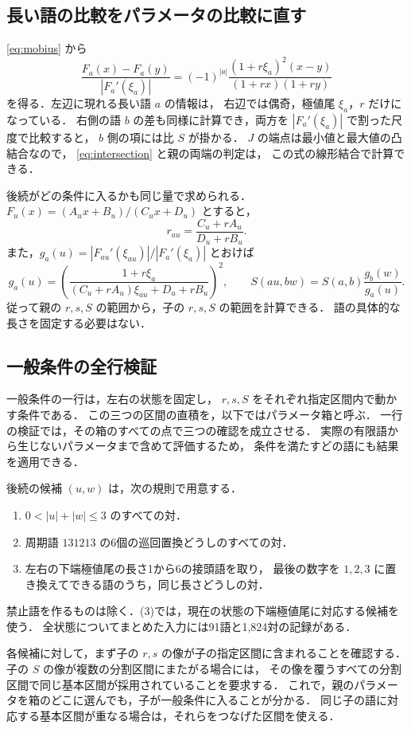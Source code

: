 \documentclass[11pt,a4paper]{article}
\theoremstyle{definition}
\begin{document}
\subsection{長い語の比較をパラメータの比較に直す}
\eqref{eq:mobius} から
\begin{equation}\label{eq:normalized-difference}
 \frac{F_a(x)-F_a(y)}{|F_a'(\xi_a)|}
 =(-1)^{|a|}\frac{(1+r\xi_a)^2(x-y)}{(1+rx)(1+ry)}
\end{equation}
を得る．左辺に現れる長い語 $a$ の情報は，
右辺では偶奇，極値尾 $\xi_a$，$r$ だけになっている．
右側の語 $b$ の差も同様に計算でき，両方を $|F_a'(\xi_a)|$ で割った尺度で比較すると，
$b$ 側の項には比 $S$ が掛かる．
$J$ の端点は最小値と最大値の凸結合なので，
\eqref{eq:intersection} と親の両端の判定は，
この式の線形結合で計算できる．

後続がどの条件に入るかも同じ量で求められる．
$F_u(x)=(A_ux+B_u)/(C_ux+D_u)$ とすると，
\[
 r_{au}=\frac{C_u+rA_u}{D_u+rB_u}.
\]
また，$g_a(u)=|F_{au}'(\xi_{au})|/|F_a'(\xi_a)|$ とおけば
\[
 g_a(u)=
 \left(\frac{1+r\xi_a}
 {(C_u+rA_u)\xi_{au}+D_u+rB_u}\right)^2,\qquad
 S(au,bw)=S(a,b)\frac{g_b(w)}{g_a(u)}.
\]
従って親の $r,s,S$ の範囲から，子の $r,s,S$ の範囲を計算できる．
語の具体的な長さを固定する必要はない．

\subsection{一般条件の全行検証}
一般条件の一行は，左右の状態を固定し，
$r,s,S$ をそれぞれ指定区間内で動かす条件である．
この三つの区間の直積を，以下ではパラメータ箱と呼ぶ．
一行の検証では，その箱のすべての点で三つの確認を成立させる．
実際の有限語から生じないパラメータまで含めて評価するため，
条件を満たすどの語にも結果を適用できる．

後続の候補 $(u,w)$ は，次の規則で用意する．
\begin{enumerate}
\item $0<|u|+|w|\le3$ のすべての対．
\item 周期語 $131213$ の6個の巡回置換どうしのすべての対．
\item 左右の下端極値尾の長さ1から6の接頭語を取り，
最後の数字を $1,2,3$ に置き換えてできる語のうち，同じ長さどうしの対．
\end{enumerate}
禁止語を作るものは除く．(3)では，現在の状態の下端極値尾に対応する候補を使う．
全状態についてまとめた入力には91語と1,824対の記録がある．

各候補に対して，まず子の $r,s$ の像が子の指定区間に含まれることを確認する．
子の $S$ の像が複数の分割区間にまたがる場合には，
その像を覆うすべての分割区間で同じ基本区間が採用されていることを要求する．
これで，親のパラメータを箱のどこに選んでも，子が一般条件に入ることが分かる．
同じ子の語に対応する基本区間が重なる場合は，それらをつなげた区間を使える．
\end{document}
